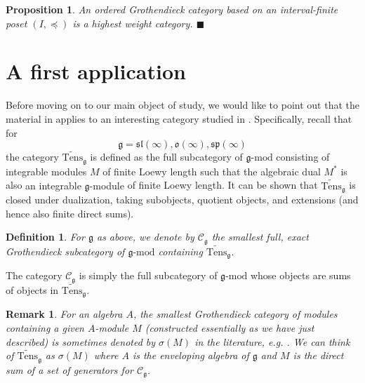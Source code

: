 \documentclass[11pt]{article}
\theoremstyle{plain}
\newtheorem{proposition}[lemma]{Proposition}
\theoremstyle{nonumberplain}
\theoremstyle{plain}
\newtheorem{definition}[lemma]{Definition}
\newtheorem{remark}[lemma]{Remark}
\theoremstyle{nonumberplain}
\newcommand\cC{\mathcal C}
\newcommand\fg{\mathfrak{g}}
\newcommand\fsl{\mathfrak{sl}}
\newcommand\fo{\mathfrak{o}}
\newcommand\fsp{\mathfrak{sp}}
\newcommand{\qedhere}{\mbox{}\hfill\ensuremath{\blacksquare}}
\begin{document}
\begin{proposition}\label{pr.hw}
  An ordered Grothendieck category based on an interval-finite poset
  $(I,{\preceq})$ is a highest weight category. \qedhere
\end{proposition}




\section{A first application}\label{se.ex}



Before moving on to our main object of study, we {would like to point out that the material in
   applies} to an interesting category studied in
\cite{PS1}. Specifically, recall that for
\begin{equation*}
  \fg=\fsl(\infty), \fo(\infty), \fsp(\infty)
\end{equation*}
the category $\widetilde{\mathrm{Tens}}_\fg$ is defined as
the full subcategory of $\fg\text{-mod}$ consisting of integrable
modules $M$ of finite Loewy length such that the algebraic dual
$M^*$ is also {an integrable
  $\fg$-module} of finite Loewy length. It can be shown that
$\widetilde{\mathrm{Tens}}_\fg$ is closed under dualization, taking
subobjects, quotient objects, and extensions (and hence also finite
direct sums).



\begin{definition}
  For $\fg$ as above, we denote by $\cC_\fg$ the smallest full, exact Grothendieck subcategory of $\fg\text{-mod}$ containing $\widetilde{\mathrm{Tens}}_\fg$. 
\end{definition}



  The category $\cC_\fg$ is simply the full subcategory of $\fg\text{-mod}$ whose objects are {sums} of objects in $\widetilde{\mathrm{Tens}}_\fg$. 

\begin{remark}\label{re.sigma}
For an algebra $A$, the smallest Grothendieck category of modules containing a given $A$-module $M$ (constructed essentially as we have just described) is sometimes denoted by $\sigma(M)$ in the literature{,} e.g. \cite[$\S$41]{BW}.  We can think of $\widetilde{\mathrm{Tens}}_\fg$ as $\sigma(M)$ where $A$ is the enveloping algebra of $\fg$ and $M$ is the direct sum of a set of generators for $\cC_\fg$.
\end{remark}
\end{document}
